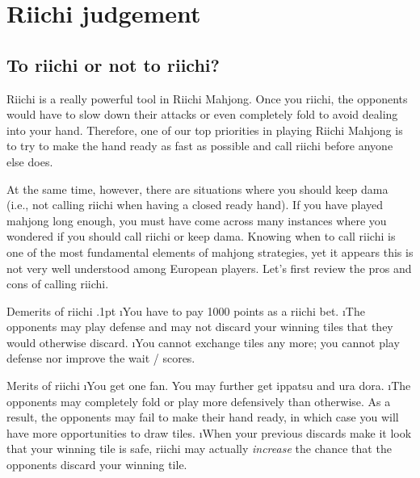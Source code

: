 
\chapter{{\jap Riichi} judgement} \label{ch:riichi}

\section{To {\jap riichi} or not to {\jap riichi}?}
{\jap Riichi} is a really powerful tool in Riichi Mahjong. Once you {\jap riichi}, the opponents would have to slow down their attacks or even completely fold to avoid dealing into your hand. Therefore, one of our top priorities in playing Riichi Mahjong is to try to make the hand ready as fast as possible and call {\jap riichi} before anyone else does.

\bigskip
At the same time, however, there are situations where you should keep {\jap dama} (i.e., not calling {\jap riichi} when having a closed ready hand). If you have played mahjong long enough, you must have come across many instances where you wondered if you should call {\jap riichi} or keep {\jap dama}. 
Knowing when to call {\jap riichi} is one of the most fundamental elements of mahjong strategies, yet it appears this is not very well understood among European players. 
Let's first review the pros and cons of calling {\jap riichi}. 

\begin{itembox}[c]{Demerits of {\jap riichi}}
	\bi \itemsep.1pt
	\i You have to pay 1000 points as a {\jap riichi} bet.
	\i The opponents may play defense and may not discard your winning tiles that they would otherwise discard.
	\i You cannot exchange tiles any more; you cannot play defense nor improve the wait / scores.
	\ei
\end{itembox}

\begin{itembox}[c]{Merits of {\jap riichi}}
	\bi
	\i You get one {\jap fan}. You may further get {\jap ippatsu} and {\jap ura dora}.
	\i The opponents may completely fold or play more defensively than otherwise. As a result, the opponents may fail to make their hand ready, in which case you will have more opportunities to draw tiles. 
	\i When your previous discards make it look that your winning tile is safe, {\jap riichi} may actually \emph{increase} the chance that the opponents discard your winning tile. 
	\ei
\end{itembox}

